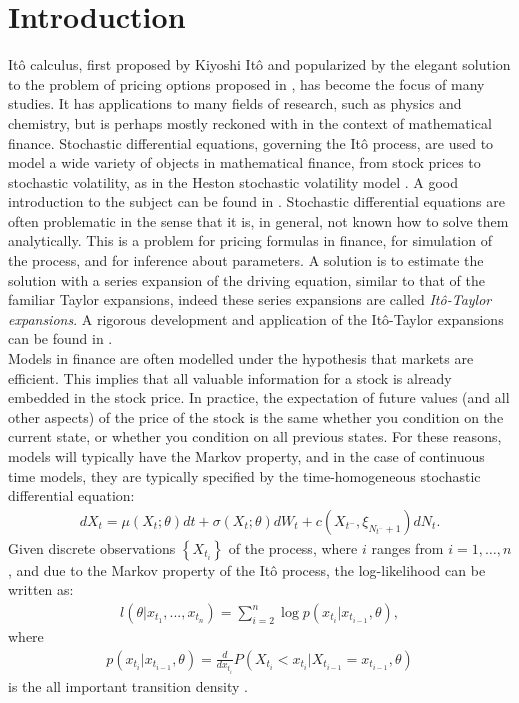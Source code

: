 \section{Introduction}
\label{sec::intro}
Itô calculus, first proposed by Kiyoshi Itô and popularized by the elegant solution to the problem of pricing options proposed in \citet{black1973pricing}, has become the focus of many studies.
It has applications to many fields of research, such as physics and chemistry, but is perhaps mostly reckoned with in the context of mathematical finance. 
Stochastic differential equations, governing the Itô process, are used to model a wide variety of objects in mathematical finance, from stock prices to stochastic volatility, as in the Heston stochastic volatility model \citep{heston1993closed}. A good introduction to the subject can be found in \citet{oksendal2003stochastic}. 
Stochastic differential equations are often problematic in the sense that it is, in general, not known how to solve them analytically.
This is a problem for pricing formulas in finance, for simulation of the process, and for inference about parameters. 
A solution is to estimate the solution with a series expansion of the driving equation, similar to that of the familiar Taylor expansions, indeed these series expansions are called \textit{Itô-Taylor expansions}. A rigorous development and application of the Itô-Taylor expansions can be found in \citet{kloeden1992numerical}.\\

Models in finance are often modelled under the hypothesis that markets are efficient. This implies that all valuable information for a stock is already embedded in the stock price. In practice, the expectation of future values (and all other aspects) of the price of the stock is the same whether you condition on the current state, or whether you condition on all previous states. For these reasons, models will typically have the Markov property, and in the case of continuous time models, they are typically specified by the time-homogeneous stochastic differential equation:
\begin{align}\label{ItoSDE}
dX_t=\mu(X_t;\theta)dt+\sigma(X_t;\theta)dW_t +c(X_{t^-},\xi_{N_{t^-}+1})dN_t.
\end{align}
Given discrete observations $\left\{X_{t_i}\right\}$ of the process, where $i$ ranges from $i=1,\ldots,n$, and due to the Markov property of the Itô process, the log-likelihood can be written as:
\begin{align}\label{Chap1 jll}
l(\theta|x_{t_1},...,x_{t_n})=\sum_{i=2}^{n}\log p(x_{t_i}|x_{t_{i-1}},\theta),
\end{align}
where
\begin{align}
p(x_{t_i}|x_{t_{i-1}},\theta)=\frac{d}{dx_{t_i}}P(X_{t_i}<x_{t_i}|X_{t_{i-1}}=x_{t_{i-1}},\theta)
\end{align}
is the all important transition density \citep{preston2012approximation, lindstrom2007estimating}.  \\

